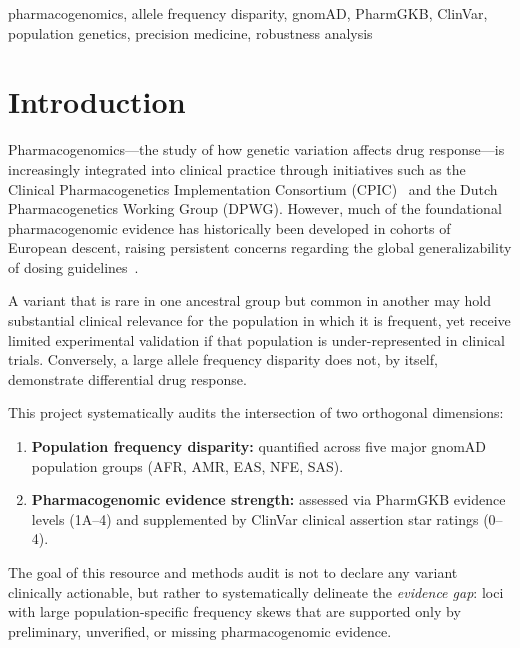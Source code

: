 \documentclass[conference]{IEEEtran}
\begin{document}
\begin{IEEEkeywords}
pharmacogenomics, allele frequency disparity, gnomAD, PharmGKB, ClinVar, population genetics, precision medicine, robustness analysis
\end{IEEEkeywords}

\section{Introduction}

Pharmacogenomics---the study of how genetic variation affects drug response---is increasingly integrated into clinical practice through initiatives such as the Clinical Pharmacogenetics Implementation Consortium (CPIC)~\cite{cpic} and the Dutch Pharmacogenetics Working Group (DPWG).
However, much of the foundational pharmacogenomic evidence has historically been developed in cohorts of European descent, raising persistent concerns regarding the global generalizability of dosing guidelines~\cite{roden2019, popejoy2016, sirugo2019}.

A variant that is rare in one ancestral group but common in another may hold substantial clinical relevance for the population in which it is frequent, yet receive limited experimental validation if that population is under-represented in clinical trials.
Conversely, a large allele frequency disparity does not, by itself, demonstrate differential drug response.

This project systematically audits the intersection of two orthogonal dimensions:
\begin{enumerate}
    \item \textbf{Population frequency disparity:} quantified across five major gnomAD population groups (AFR, AMR, EAS, NFE, SAS).
    \item \textbf{Pharmacogenomic evidence strength:} assessed via PharmGKB evidence levels (1A--4) and supplemented by ClinVar clinical assertion star ratings (0--4).
\end{enumerate}

The goal of this resource and methods audit is not to declare any variant clinically actionable, but rather to systematically delineate the \emph{evidence gap}: loci with large population-specific frequency skews that are supported only by preliminary, unverified, or missing pharmacogenomic evidence.
\end{document}
